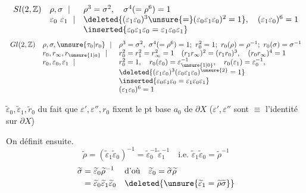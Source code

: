 \[
\begin{array}{lll}
Sl(2,\mathbb Z)&\rho,\sigma\ \mid&\rho^3=\sigma^2,\quad\sigma^4(=\rho^6)=1\\
&\varepsilon_0\ \varepsilon_1\ \mid&\deleted{(\varepsilon_1\varepsilon_0)^3\unsure{=}(\varepsilon_0\varepsilon_1\varepsilon_0)^2=1},\quad(\varepsilon_1\varepsilon_0)^6=1\\
&&\inserted{\varepsilon_0\varepsilon_1\varepsilon_0=\varepsilon_1\varepsilon_0\varepsilon_1}
\end{array}
\]
\[
\begin{array}{lll}
Gl(2,\mathbb Z)&\rho,\sigma,\unsure{\tau_0|r_0}\ \mid&\rho^3=\sigma^2,\ \sigma^4(=\rho^6)=1;\ r_0^2=1;\ r_0(\rho)=\rho^{-1};\ r_0(\sigma)=\sigma^{-1}\\
&r_0,r_\infty,r_{\unsure{1|a}}\ \mid&r_0^2=r_1^2=r_\infty^2=1\quad(r_1r_\infty)^2=(r_1r_0)^3,\quad(r_0r_\infty)^4=1\\
&r_0,\varepsilon_0,\varepsilon_1\ \mid&r_0^2=1,\quad r_0(\varepsilon_0)=\varepsilon_{\unsure{1|0}}^{-1},\quad r_0(\varepsilon_1)=\varepsilon_0^{-1},\\
&&\deleted{(\varepsilon_1\varepsilon_0)^3(\varepsilon_0\varepsilon_1\varepsilon_0)^{\unsure{2}}=1}\\
&&\inserted{\varepsilon_0\varepsilon_1\varepsilon_0=\varepsilon_1\varepsilon_0\varepsilon_1}\\
&&(\varepsilon_1\varepsilon_0)^6=1
\end{array}
\]

$\widetilde\varepsilon_0,\widetilde\varepsilon_1,\widetilde r_0$  du fait que $\varepsilon',\varepsilon'',r_0$ fixent le pt base $a_0$ de $\partial X$ ($\varepsilon',\varepsilon''$ sont $\equiv$ l'identité sur $\partial X$)

On définit ensuite.
\[
\widetilde\rho=(\widetilde\varepsilon_1\widetilde\varepsilon_0)^{-1}
=\widetilde\varepsilon_0^{-1}\widetilde\varepsilon_1^{-1}
\quad\text{i.e. }\widetilde\varepsilon_1\widetilde\varepsilon_0=\widetilde\rho^{-1}
\]
\[
\begin{aligned}
\widetilde\sigma&=\widetilde\varepsilon_0\widetilde\rho^{-1}&&\text{d'où}\quad\widetilde\varepsilon_0=\widetilde\sigma\widetilde\rho\\
&=\widetilde\varepsilon_0\widetilde\varepsilon_1\widetilde\varepsilon_0
&&\deleted{\unsure{\widetilde\varepsilon_1=\widetilde\rho\widetilde\sigma}}
\end{aligned}
\]

